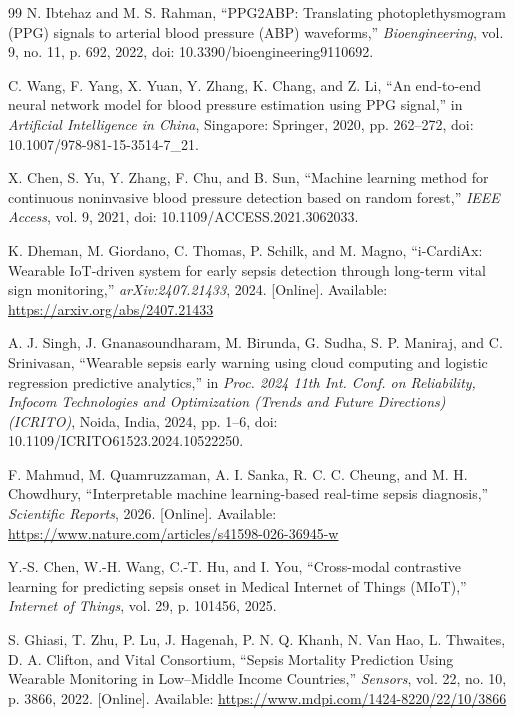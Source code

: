 \documentclass[11pt,a4paper]{article}
\begin{document}
\begin{thebibliography}{99}
N. Ibtehaz and M. S. Rahman, ``PPG2ABP: Translating photoplethysmogram (PPG) signals to arterial blood pressure (ABP) waveforms,'' \textit{Bioengineering}, vol. 9, no. 11, p. 692, 2022, doi: 10.3390/bioengineering9110692.

C. Wang, F. Yang, X. Yuan, Y. Zhang, K. Chang, and Z. Li, ``An end-to-end neural network model for blood pressure estimation using PPG signal,'' in \textit{Artificial Intelligence in China}, Singapore: Springer, 2020, pp. 262--272, doi: 10.1007/978-981-15-3514-7\_21.

X. Chen, S. Yu, Y. Zhang, F. Chu, and B. Sun, ``Machine learning method for continuous noninvasive blood pressure detection based on random forest,'' \textit{IEEE Access}, vol. 9, 2021, doi: 10.1109/ACCESS.2021.3062033.

K. Dheman, M. Giordano, C. Thomas, P. Schilk, and M. Magno, ``i-CardiAx: Wearable IoT-driven system for early sepsis detection through long-term vital sign monitoring,'' \textit{arXiv:2407.21433}, 2024. [Online]. Available: \url{https://arxiv.org/abs/2407.21433}

A. J. Singh, J. Gnanasoundharam, M. Birunda, G. Sudha, S. P. Maniraj, and C. Srinivasan, ``Wearable sepsis early warning using cloud computing and logistic regression predictive analytics,'' in \textit{Proc. 2024 11th Int. Conf. on Reliability, Infocom Technologies and Optimization (Trends and Future Directions) (ICRITO)}, Noida, India, 2024, pp. 1--6, doi: 10.1109/ICRITO61523.2024.10522250.

F. Mahmud, M. Quamruzzaman, A. I. Sanka, R. C. C. Cheung, and M. H. Chowdhury, ``Interpretable machine learning-based real-time sepsis diagnosis,'' \textit{Scientific Reports}, 2026. [Online]. Available: \url{https://www.nature.com/articles/s41598-026-36945-w}

Y.-S. Chen, W.-H. Wang, C.-T. Hu, and I. You, ``Cross-modal contrastive learning for predicting sepsis onset in Medical Internet of Things (MIoT),'' \textit{Internet of Things}, vol. 29, p. 101456, 2025.

S. Ghiasi, T. Zhu, P. Lu, J. Hagenah, P. N. Q. Khanh, N. Van Hao, L. Thwaites, D. A. Clifton, and Vital Consortium, ``Sepsis Mortality Prediction Using Wearable Monitoring in Low--Middle Income Countries,'' \textit{Sensors}, vol. 22, no. 10, p. 3866, 2022. [Online]. Available: \url{https://www.mdpi.com/1424-8220/22/10/3866}


\end{thebibliography}
\end{document}
